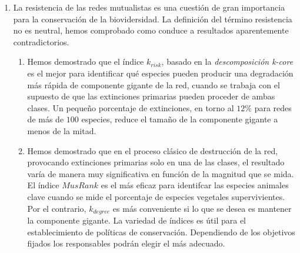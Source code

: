 \begin{enumerate}
\item La resistencia de las redes mutualistas es una cuestión de gran importancia para la conservación de la biovidersidad. La definición del término resistencia no es neutral, hemos comprobado como conduce a resultados aparentemente contradictorios.
	\begin{enumerate}
	\item Hemos demostrado que el índice ${k}_{risk}$, basado en la \textit{descomposición k-core} es el mejor para identificar qué especies pueden producir una degradación más rápida de componente gigante de la red, cuando se trabaja con el supuesto de que las extinciones primarias pueden proceder de ambas clases. Un pequeño porcentaje de extinciones, en torno al $12\%$ para redes de más de $100$ especies, reduce el tamaño de la componente gigante a menos de la mitad.
	\item Hemos demostrado que en el proceso clásico de destrucción de la red, provocando extinciones primarias solo en una de las clases, el resultado varía de manera muy significativa en función de la magnitud que se mida. El índice $MusRank$ es el más eficaz para identifcar las especies animales clave cuando se mide el porcentaje de especies vegetales supervivientes. Por el contrario, ${k}_{degree}$ es más conveniente si lo que se desea es mantener la componente gigante. La variedad de índices es útil para el establecimiento de políticas de conservación. Dependiendo de los objetivos fijados los responsables podrán elegir el más adecuado.
	\end{enumerate}
	
\end{enumerate}